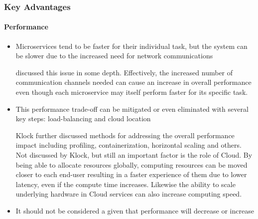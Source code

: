 \begin{frame}
  \frametitle{Key Advantages}
  \framesubtitle{Performance}
  \begin{itemize}

    \item<1-> Microservices tend to be faster for their individual task, but the system can be slower due to the increased need for network communications

           {\scriptsize{\textcite{klockWorkloadBasedClusteringCoherent2017} discussed this issue in some depth. Effectively, the increased number of communication channels needed can cause an increase in overall performance even though each microservice may itself perform faster for its specific task.}}

    \item<2-> This performance trade-off can be mitigated or even eliminated with several key steps: load-balancing and cloud location

           {\scriptsize{Klock further discussed methods for addressing the overall performance impact including profiling, containerization, horizontal scaling and others. Not discussed by Klock, but still an important factor is the role of Cloud. By being able to allocate resources globally, computing resources can be moved closer to each end-user resulting in a faster experience of them due to lower latency, even if the compute time increases. Likewise the ability to scale underlying hardware in Cloud services can also increase computing speed.}}

    \item<3-> It should not be considered a given that performance will decrease or increase


  \end{itemize}
\end{frame}
